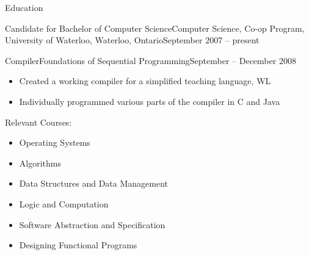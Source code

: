 \documentclass[11pt]{article}
\begin{document}
\begin{section}{Education}
\begin{subsection}{Candidate for Bachelor of Computer Science}{Computer Science, Co-op Program, University of Waterloo, Waterloo, Ontario}{September 2007 -- present}
\begin{indent}
\begin{subsection}{Compiler}{Foundations of Sequential Programming}{September -- December 2008}
					\begin{itemize}
						\item Created a working compiler for a simplified teaching language, WL
						\item Individually programmed various parts of the compiler in C and Java
					\end{itemize}

				\end{subsection}

				\begin{bf}Relevant Courses:\end{bf}

				\begin{itemize}
                    \item Operating Systems
                    \item Algorithms
					\item Data Structures and Data Management
					\item Logic and Computation
					\item Software Abstraction and Specification
					\item Designing Functional Programs
				\end{itemize}
			\end{indent}

		\end{subsection}

	\end{section}
\end{document}
